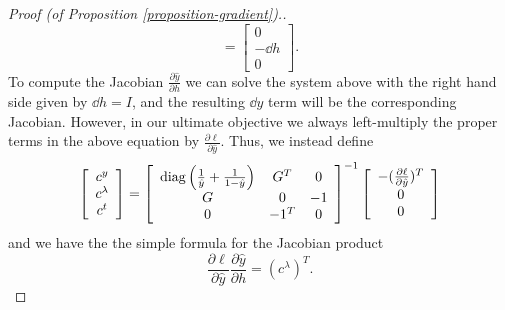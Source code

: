 \begin{proof}[Proof (of Proposition \ref{proposition-gradient}).]
\begin{equation}
= \left [ \begin{array}{c} 0 \\ -\dd h \\ 0 \end{array} \right ].
\end{equation}
To compute the Jacobian $\frac{\partial \hat{y}}{\partial h}$ we can solve the
system above with the right hand side given by $\dd h = I$, and the resulting
$\dd y$ term will be the corresponding Jacobian.  However, in our ultimate
objective we always left-multiply the proper terms in the above equation by
$\frac{\partial \ell}{\partial \hat{y}}$.  Thus, we instead define
{\small
\begin{equation}
\left [ \begin{array}{c} c^y \\ c^\lambda \\ c^t \end{array} \right ]
 = \left [ \begin{array}{ccc}
\operatorname*{diag}\left(\frac{1}{\hat y} + \frac{1}{1-\hat y}\right) & G^T & 0 \\
G & 0 & -1 \\
0 & -1^T & 0 \end{array} \right ]^{-1}
\left [ \begin{array}{c} -(\frac{\partial \ell}{\partial \hat y})^T \\ 0 \\ 0
\end{array} \right ]
\end{equation}
}
and we have the the simple formula for the Jacobian product
\begin{equation}
\frac{\partial \ell}{\partial \hat{y}} \frac{\partial \hat{y}}{\partial h} =
(c^\lambda)^T.
\end{equation}


\end{proof}

